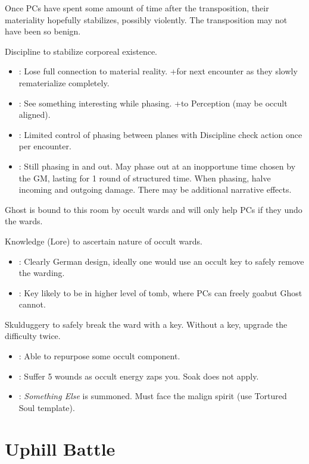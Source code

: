 \documentclass{book}
\newcommand{\df}{\DifficultyDie }
\newcommand{\stb}{\SetbackDie }
\newcommand{\ch}{\ChallengeDie }
\newcommand{\bbb}{\BoostDie }
\begin{document}
\begin{multicols}{2}
    Once PCs have spent some amount of time after the transposition, their materiality hopefully stabilizes, possibly violently.  The transposition may not have been so benign.

\ch\df Discipline to stabilize corporeal existence.
    \begin{itemize}
        \item \Failure: Lose full connection to material reality.  +\stb for next encounter as they slowly rematerialize completely.
        \item \Advantage: See something interesting while phasing.  +\bbb to Perception (may be occult aligned).
        \item \Triumph: Limited control of phasing between planes with \df\df\df Discipline check action once per encounter.
        \item \Despair: Still phasing in and out.  May phase out at an inopportune time chosen by the GM, lasting for 1 round of structured time.  When phasing, halve incoming and outgoing damage.  There may be additional narrative effects.
    \end{itemize}

Ghost is bound to this room by occult wards and will only help PCs if they undo the wards.

    \df\df Knowledge (Lore) to ascertain nature of occult wards.
    \begin{itemize}
        \item \Success: Clearly German design, ideally one would use an occult key to safely remove the warding.
        \item \Advantage: Key likely to be in higher level of tomb, where PCs can freely goabut Ghost cannot.
    \end{itemize}

\df\df\stb\stb Skulduggery to safely break the ward with a key.  Without a key, upgrade the difficulty twice.
    \begin{itemize}
        \item \Advantage: Able to repurpose some occult component.
        \item \Failure: Suffer 5 wounds as occult energy zaps you.  Soak does not apply.
        \item \Despair: \emph{Something Else} is summoned.  Must face the malign spirit (use Tortured Soul template).
    \end{itemize}

\section{Uphill Battle}


\end{multicols}
\end{document}
